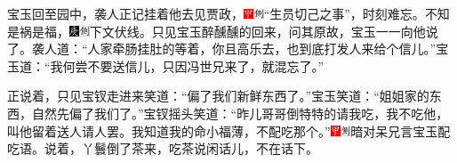 宝玉回至园中，袭人正记挂着他去见贾政，{\includegraphics[width=3mm]{../Images/00002}\includegraphics[width=3mm]{../Images/00011}\footnotesize \kaishu ``生员切己之事''，时刻难忘。}不知是祸是福，{\includegraphics[width=3mm]{../Images/00004}\includegraphics[width=3mm]{../Images/00011}\footnotesize \kaishu 下文伏线。}只见宝玉醉醺醺的回来，问其原故，宝玉一一向他说了。袭人道：``人家牵肠挂肚的等着，你且高乐去，也到底打发人来给个信儿。''宝玉道：``我何尝不要送信儿，只因冯世兄来了，就混忘了。''

正说着，只见宝钗走进来笑道：``偏了我们新鲜东西了。''宝玉笑道：``姐姐家的东西，自然先偏了我们了。''宝钗摇头笑道：``昨儿哥哥倒特特的请我吃，我不吃他，叫他留着送人请人罢。我知道我的命小福薄，不配吃那个。''{\includegraphics[width=3mm]{../Images/00002}\includegraphics[width=3mm]{../Images/00011}\footnotesize \kaishu 暗对呆兄言宝玉配吃语。}说着，丫鬟倒了茶来，吃茶说闲话儿，不在话下。

